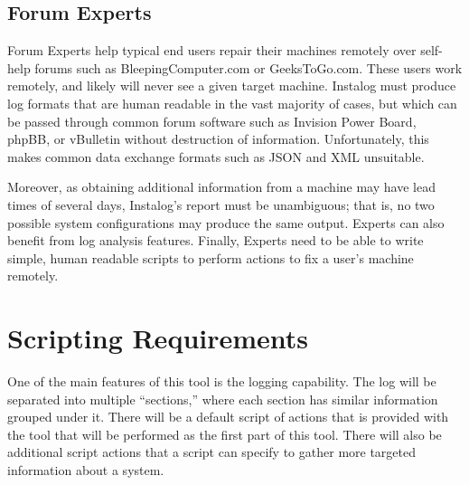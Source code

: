 \documentclass[letterpaper,12pt]{article}
\begin{document}
\subsection{Forum Experts}
Forum Experts help typical end users repair their machines remotely over
self-help forums such as BleepingComputer.com or GeeksToGo.com.
These users work remotely, and likely will never see a given target
machine.
Instalog must produce log formats that are human readable in the vast majority
of cases, but which can be passed through common forum software such as Invision
Power Board, phpBB, or vBulletin without destruction of information.
Unfortunately, this makes common data exchange formats such as JSON and XML
unsuitable. 

Moreover, as obtaining additional information from a machine may
have lead times of several days, Instalog's report must be unambiguous; that is,
no two possible system configurations may produce the same output. Experts can
also benefit from log analysis features. Finally, Experts need to be able to
write simple, human readable scripts to perform actions to fix a user's machine
remotely.

\newpage



\section{Scripting Requirements}
One of the main features of this tool is the logging capability.  The log will
be separated into multiple ``sections,'' where each section has similar
information grouped under it.  There will be a default script of actions that is
provided with the tool that will be performed as the first part of this tool.   
There will also be additional script actions that a script can specify to gather
more targeted information about a system.

\newpage
\end{document}
